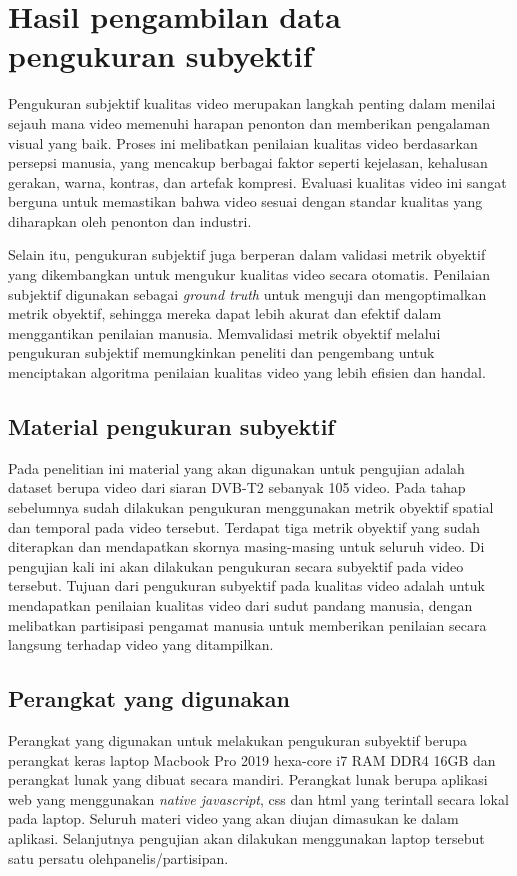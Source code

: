 \section{Hasil pengambilan data pengukuran subyektif}
\hspace{1,2cm}
Pengukuran subjektif kualitas video merupakan langkah penting dalam menilai sejauh mana video memenuhi harapan penonton dan memberikan pengalaman visual yang baik. Proses ini melibatkan penilaian kualitas video berdasarkan persepsi manusia, yang mencakup berbagai faktor seperti kejelasan, kehalusan gerakan, warna, kontras, dan artefak kompresi. Evaluasi kualitas video ini sangat berguna untuk memastikan bahwa video sesuai dengan standar kualitas yang diharapkan oleh penonton dan industri.

Selain itu, pengukuran subjektif juga berperan dalam validasi metrik obyektif yang dikembangkan untuk mengukur kualitas video secara otomatis. Penilaian subjektif digunakan sebagai \textit{ground truth} untuk menguji dan mengoptimalkan metrik obyektif, sehingga mereka dapat lebih akurat dan efektif dalam menggantikan penilaian manusia. Memvalidasi metrik obyektif melalui pengukuran subjektif memungkinkan peneliti dan pengembang untuk menciptakan algoritma penilaian kualitas video yang lebih efisien dan handal.

\subsection{Material pengukuran subyektif}
\hspace{1,2cm}
Pada penelitian ini material yang akan digunakan untuk pengujian adalah dataset berupa video dari siaran DVB-T2 sebanyak 105 video. Pada tahap sebelumnya sudah dilakukan pengukuran menggunakan metrik obyektif spatial dan temporal pada video tersebut. Terdapat tiga metrik obyektif yang sudah diterapkan dan mendapatkan skornya masing-masing untuk seluruh video. Di pengujian kali ini akan dilakukan pengukuran secara subyektif pada video tersebut. Tujuan dari pengukuran subyektif pada kualitas video adalah untuk mendapatkan penilaian kualitas video dari sudut pandang manusia, dengan melibatkan partisipasi pengamat manusia untuk memberikan penilaian secara langsung terhadap video yang ditampilkan.

\subsection{Perangkat yang digunakan}
\hspace{1,2cm}
Perangkat yang digunakan untuk melakukan pengukuran subyektif berupa perangkat keras laptop Macbook Pro 2019 hexa-core i7 RAM DDR4 16GB dan perangkat lunak yang dibuat secara mandiri. Perangkat lunak berupa aplikasi web yang menggunakan \textit{native javascript}, css dan html yang terintall secara lokal pada laptop. Seluruh materi video yang akan diujan dimasukan ke dalam aplikasi. Selanjutnya pengujian akan dilakukan menggunakan laptop tersebut satu persatu olehpanelis/partisipan.

